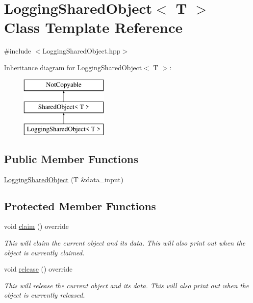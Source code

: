 \hypertarget{class_logging_shared_object}{}\section{Logging\+Shared\+Object$<$ T $>$ Class Template Reference}
\label{class_logging_shared_object}


{\ttfamily \#include $<$Logging\+Shared\+Object.\+hpp$>$}

Inheritance diagram for Logging\+Shared\+Object$<$ T $>$\+:\begin{figure}[H]
\begin{center}
\leavevmode
\includegraphics[height=3.000000cm]{class_logging_shared_object}
\end{center}
\end{figure}
\subsection*{Public Member Functions}
\begin{DoxyCompactItemize}
\item 
\hyperlink{class_logging_shared_object_a8cd7a5f32d233c349638f46b2dfc2ac0}{Logging\+Shared\+Object} (T \&data\+\_\+input)
\end{DoxyCompactItemize}
\subsection*{Protected Member Functions}
\begin{DoxyCompactItemize}
\item 
\hypertarget{class_logging_shared_object_a1b92e112cefa988dc857dfa2157f3da5}{}void \hyperlink{class_logging_shared_object_a1b92e112cefa988dc857dfa2157f3da5}{claim} () override\label{class_logging_shared_object_a1b92e112cefa988dc857dfa2157f3da5}

\begin{DoxyCompactList}\small\item\em This will claim the current object and it\textquotesingle{}s data. This will also print out when the object is currently claimed. \end{DoxyCompactList}\item 
\hypertarget{class_logging_shared_object_af01b8494abe27d86d656d0c968037001}{}void \hyperlink{class_logging_shared_object_af01b8494abe27d86d656d0c968037001}{release} () override\label{class_logging_shared_object_af01b8494abe27d86d656d0c968037001}

\begin{DoxyCompactList}\small\item\em This will release the current object and it\textquotesingle{}s data. This will also print out when the object is currently released. \end{DoxyCompactList}\end{DoxyCompactItemize}
